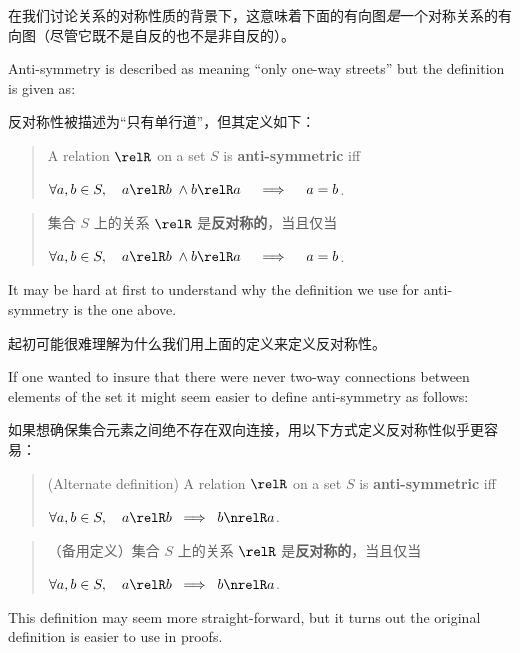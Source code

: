 在我们讨论关系的对称性质的背景下，这意味着下面的有向图\emph{是}一个对称关系的有向图（尽管它既不是自反的也不是非自反的）。

\begin{center}

\end{center}

Anti-symmetry is described as meaning ``only one-way streets'' but the definition is given
as:

反对称性被描述为“只有单行道”，但其定义如下：

\begin{quote}
A relation $\relR$ on a set $S$ is {\bf anti-symmetric} iff \newline
\centerline{ $\displaystyle \forall a,b \in S, \quad a \relR b \;
\land b \relR a \quad \implies \quad a=b$.}
\end{quote}

\begin{quote}
集合 $S$ 上的关系 $\relR$ 是{\bf 反对称的}，当且仅当 \newline
\centerline{ $\displaystyle \forall a,b \in S, \quad a \relR b \;
\land b \relR a \quad \implies \quad a=b$.}
\end{quote}

It may be hard at first to understand why the definition we use for anti-symmetry is the one above.

起初可能很难理解为什么我们用上面的定义来定义反对称性。

If one wanted to insure that there were never two-way connections between elements of the set it
might seem easier to define anti-symmetry as follows:

如果想确保集合元素之间绝不存在双向连接，用以下方式定义反对称性似乎更容易：

\begin{quote}
(Alternate definition) A relation $\relR$ on a set $S$ is {\bf anti-symmetric} iff \newline
\centerline{ $\displaystyle \forall a,b \in S, \quad a \relR b \;
\implies \; b \nrelR a$.}
\end{quote}

\begin{quote}
（备用定义）集合 $S$ 上的关系 $\relR$ 是{\bf 反对称的}，当且仅当 \newline
\centerline{ $\displaystyle \forall a,b \in S, \quad a \relR b \;
\implies \; b \nrelR a$.}
\end{quote}

This definition may seem more straight-forward, but it turns out the original definition is
easier to use in proofs.


